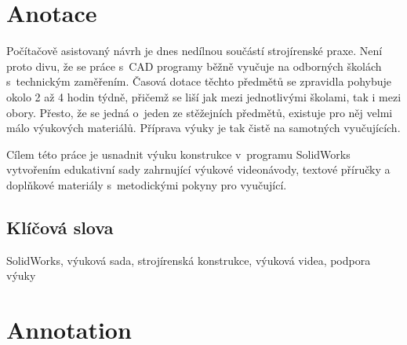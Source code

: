 \documentclass{template/socthesis}
\author{Petr Štourač}
\begin{document}

\maketitle



\makethanks{}

\pagestyle{empty}

\section*{Anotace}
Počítačově asistovaný návrh je dnes nedílnou součástí strojírenské praxe.
Není proto divu, že se práce s~CAD programy běžně vyučuje na odborných školách s~technickým zaměřením.
Časová dotace těchto předmětů se zpravidla pohybuje okolo 2 až 4 hodin týdně, přičemž se liší jak mezi jednotlivými školami, tak i mezi obory.
Přesto, že se jedná o~jeden ze stěžejních předmětů, existuje pro něj velmi málo výukových materiálů.
Příprava výuky je tak čistě na samotných vyučujících.

Cílem této práce je usnadnit výuku konstrukce v~programu SolidWorks vytvořením edukativní sady zahrnující výukové videonávody, textové příručky a doplňkové materiály s~metodickými pokyny pro vyučující.

\subsection*{Klíčová slova}
SolidWorks, výuková sada, strojírenská konstrukce, výuková videa, podpora výuky

\vspace{20mm}

\section*{Annotation}
\end{document}
